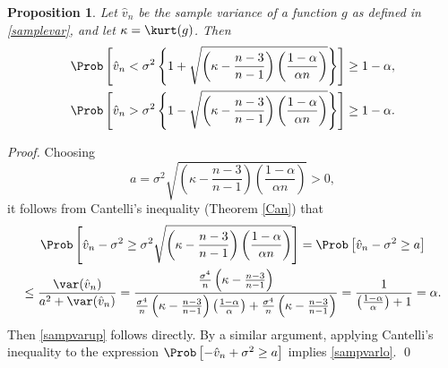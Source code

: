 \documentclass[graybox]{svmult}
\newcommand{\hv}{\hat{v}}
\newtheorem{prop}[theorem]{Proposition}
\begin{document}
\begin{prop}\label{propCant} Let $\hv_n$ be the sample variance of a function $g$ as defined in \eqref{samplevar}, and let $\kappa=\kurt(g)$.  Then
\begin{subequations} \label{sampvarbd}
\begin{gather}\label{sampvarup}
\Prob\left[\hv_n < \sigma^2 \left\{1 + \sqrt{\left ( \kappa  - \frac{n-3}{n-1}\right)\left(\frac{1-\alpha}{\alpha n}\right)}\right\} \right] \ge 1 - \alpha, \\
\label{sampvarlo}
\Prob\left[\hv_n > \sigma^2 \left\{1 - \sqrt{\left ( \kappa  - \frac{n-3}{n-1}\right)\left(\frac{1-\alpha}{\alpha n}\right)}\right\} \right] \ge 1 - \alpha.
\end{gather}
\end{subequations}
\end{prop}
\begin{proof}Choosing
$$a=\sigma^2\sqrt{\left(\kappa-\frac{n-3}{n-1}\right)\left(\frac{1-\alpha}{\alpha n}\right)} >0,
$$
it follows from Cantelli's inequality (Theorem \ref{Can})  that
\begin{multline*}
\Prob\left[\hv_n-\sigma^2 \geq
\sigma^2\sqrt{\left(\kappa-\frac{n-3}{n-1}\right)\left(\frac{1-\alpha}{\alpha n}\right)} \right]  = \Prob\left[\hv_n-\sigma^2 \geq
a \right]\\
 \leq\frac{\var(\hv_n)}{a^2+\var(\hv_n)} 
= \frac{\frac{\sigma^4}{n}\left(\kappa - \frac{n-3}{n-1}\right)}{\frac{\sigma^4}{n}\left(\kappa - \frac{n-3}{n-1}\right)\left(\frac{1-\alpha}{\alpha}\right)+\frac{\sigma^4}{n}\left(\kappa - \frac{n-3}{n-1}\right)} 
=\frac{1}{\left(\frac{1-\alpha}{\alpha}\right)+1}=\alpha.
\end{multline*}
Then \eqref{sampvarup} follows directly.  By a similar argument, applying Cantelli's inequality to the expression $\Prob\left[-\hv_n+\sigma^2 \ge a \right]$ implies  \eqref{sampvarlo}. \qed
\end{proof}
\end{document}

